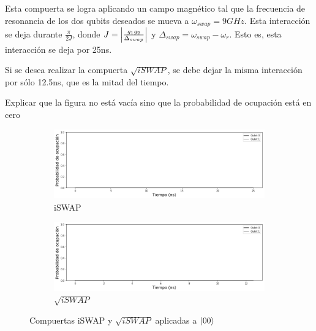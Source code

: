 Esta compuerta se logra aplicando un campo magnético tal que la frecuencia de resonancia de los dos qubits deseados se mueva a $\omega_{swap} = 9GHz$. Esta interacción se deja durante $\frac{\pi}{2 J}$, donde $J = \abs{\frac{g_1 g_2}{\Delta_{swap}}}$ y $\Delta_{swap} = \omega_{swap} - \omega_r$. Esto es, esta interacción se deja por 25ns.

Si se desea realizar la compuerta $\sqrt{iSWAP}$, se debe dejar la misma interacción por sólo 12.5ns, que es la mitad del tiempo.

\color{red}
Explicar que la figura no está vacía sino que la probabilidad de ocupación está en cero
\color{black}

\begin{figure}[H]
    \centering
    \begin{subfigure}[m]{0.49\textwidth}
        \centering \includegraphics[width=1\linewidth]{img/iswap00.png}
        \caption{iSWAP}
    \end{subfigure}
    \begin{subfigure}[m]{0.49\textwidth}
        \centering \includegraphics[width=1\linewidth]{img/sqrtiswap00.png}
        \caption{$\sqrt{iSWAP}$}
    \end{subfigure}
    \caption[Compuertas iSWAP y $\sqrt{iSWAP}$ aplicadas a $\ket{00}$]{Compuertas iSWAP y $\sqrt{iSWAP}$ aplicadas a $\ket{00}$}
\label{fig:iswapsqrtiswap00}
\end{figure}


